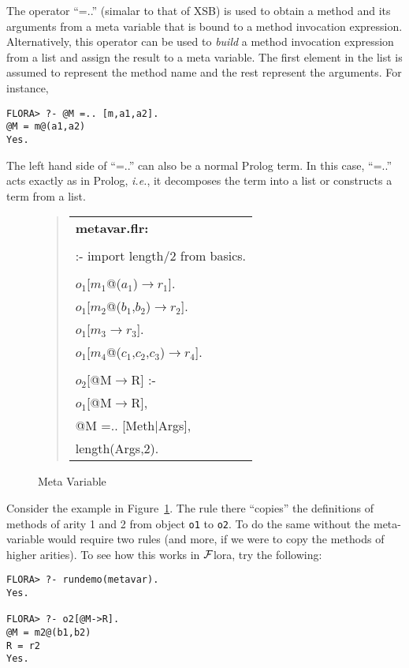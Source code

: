 \documentclass[11pt]{article}
\newcommand{\fd}{\ensuremath{{\rightarrow}}}                   %
\newcommand{\FLORA}{{\mbox{${\cal F}${\sc lora}}}\xspace}
\begin{document}
The operator ``=..'' (simalar to that of XSB) is used to obtain a method and
its arguments from a meta variable that is bound to a method invocation
expression. Alternatively, this operator can be used to \emph{build} a
method invocation expression from a list and assign the result to a meta
variable. The first element in the list is assumed to represent the method
name and the rest represent the arguments.  For instance,
\begin{verbatim}
FLORA> ?- @M =.. [m,a1,a2].
@M = m@(a1,a2)
Yes.
\end{verbatim}
\noindent
The left hand side of ``=..'' can also be a normal Prolog term. In this
case,
``=..'' acts exactly as in Prolog, {\it i.e.}, it decomposes the term into
a list or constructs a term from a list.
\begin{figure}[tb]
\begin{quote}
\begin{tabular}{l}
{\bf metavar.flr:}\\ \\
:- import length/2 from basics. \\ \\
$o_1$[$m_1$@($a_1$){\fd}$r_1$]. \\
$o_1$[$m_2$@($b_1$,$b_2$){\fd}$r_2$]. \\
$o_1$[$m_3${\fd}$r_3$]. \\
$o_1$[$m_4$@($c_1$,$c_2$,$c_3$){\fd}$r_4$]. \\ \\
$o_2$[@M{\fd}R] :- \\
\hspace{1.5cm}	$o_1$[@M{\fd}R], \\
\hspace{1.5cm}	@M =.. [Meth$|$Args], \\
\hspace{1.5cm}	length(Args,2).
\end{tabular}
\end{quote}
\caption{Meta Variable} \label{fig:fig-metavar}
\end{figure}

Consider the example in Figure~\ref{fig:fig-metavar}.  The rule there
``copies'' the definitions of methods of arity 1 and 2 from object {\tt o1}
to {\tt o2}. To do the same without the meta-variable would require two
rules (and more, if we were to copy the methods of higher arities).  To see
how this works in \FLORA, try the following:
\begin{verbatim}
FLORA> ?- rundemo(metavar).
Yes.

FLORA> ?- o2[@M->R].
@M = m2@(b1,b2)
R = r2
Yes.
\end{verbatim}
\end{document}
